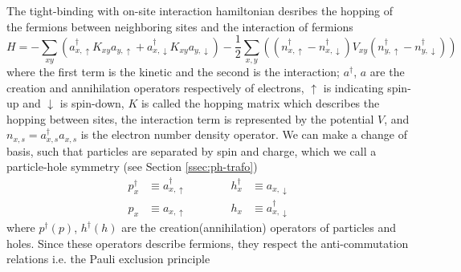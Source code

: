 The tight-binding with on-site interaction hamiltonian desribes the hopping of the fermions between neighboring sites and the interaction of fermions
\begin{equation}
    H = - \sum_{xy} \left( a^\dagger_{x,\uparrow} K_{xy} a_{y,\uparrow} + a^\dagger_{x,\downarrow} K_{xy} a_{y,\downarrow} \right) - \frac{1}{2} \sum_{x,y} \left( (n^\dagger_{x,\uparrow} - n^\dagger_{x,\downarrow}) V_{xy} (n^\dagger_{y,\uparrow} - n^\dagger_{y,\downarrow}) \right)
\end{equation}
where the first term is the kinetic and the second is the interaction; $a^\dagger$, $a$ are the creation and annihilation operators respectively of electrons, $\uparrow$ is indicating spin-up and $\downarrow$ is spin-down, $K$ is called the hopping matrix which describes the hopping between sites, the interaction term is represented by the potential $V$, and $n_{x,s} = a^\dagger_{x,s} a_{x,s}$ is the electron number density operator. We can make a change of basis, such that particles are separated by spin and charge, which we call a particle-hole symmetry (see Section \ref{ssec:ph-trafo})
\begin{equation}
    \begin{aligned}
        p^\dagger_x & \equiv a^\dagger_{x,\uparrow} \qquad\qquad h^\dagger_x & \equiv a_{x,\downarrow} \\
        p_x & \equiv a_{x,\uparrow} \qquad\qquad h_x & \equiv a^\dagger_{x,\downarrow}
    \end{aligned}
    \label{eq:ph-switch}
\end{equation}
where $p^\dagger (p)$, $h^\dagger (h)$ are the creation(annihilation) operators of particles and holes. Since these operators describe fermions, they respect the anti-commutation relations i.e. the Pauli exclusion principle

